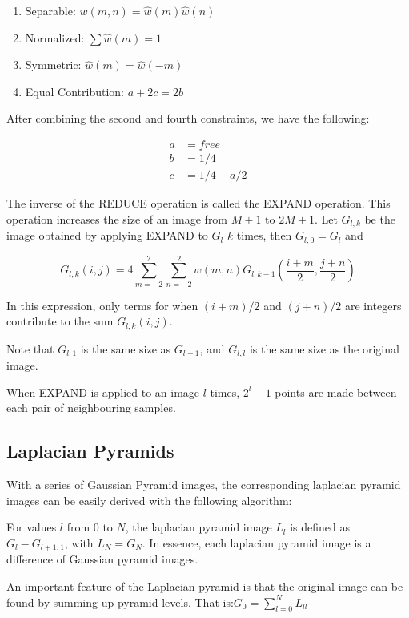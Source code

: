 \documentclass{article}
\begin{document}
\begin{multicols}{3}
\begin{enumerate}
\itemsep0em
\item {Separable: $w(m,n) = \hat{w}(m)\hat{w}(n)$}
\item {Normalized: $\sum \hat{w}(m) = 1$}
\item {Symmetric: $\hat{w}(m) = \hat{w}(-m)$}
\item {Equal Contribution: $a+2c = 2b$}
\end{enumerate}

After combining the second and fourth constraints, we have the following:

\[
\begin{aligned}
  a &= free\\
  b &= 1/4\\
  c &= 1/4 - a/2
\end{aligned}
\]

The inverse of the REDUCE operation is called the EXPAND operation. This operation increases the size of an image from $M+1$ to $2M+1$. Let $G_{l,k}$ be the image obtained by applying EXPAND to $G_l$ $k$ times, then $G_{l,0} = G_{l}$ and

$$
G_{l,k}(i,j) = 4\sum_{m = -2}^2 \sum_{n = -2}^2 w(m,n) G_{l,k-1}(\frac{i+m}{2}, \frac{j+n}{2})
$$

In this expression, only terms for when $(i+m)/2$ and $(j+n)/2$ are integers contribute to the sum $G_{l,k}(i,j)$.

Note that $G_{l,1}$ is the same size as $G_{l-1}$, and $G_{l,l}$ is the same size as the original image.

When EXPAND is applied to an image $l$ times, $2^l-1$ points are made between each pair of neighbouring samples.

\subsection{Laplacian Pyramids}

With a series of Gaussian Pyramid images, the corresponding laplacian pyramid images can be easily derived with the following algorithm:

For values $l$ from 0 to $N$, the laplacian pyramid image $L_l$ is defined as $G_l - G_{l+1,1}$, with $L_N = G_N$. In essence, each laplacian pyramid image is a difference of Gaussian pyramid images.

An important feature of the Laplacian pyramid is that the original image can be found by summing up pyramid levels. That is:$G_0 = \sum_{l=0}^{N}L_{ll}$


\end{multicols}
\end{document}
